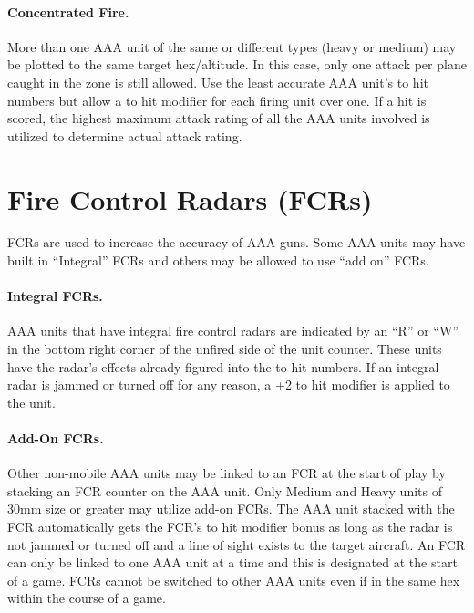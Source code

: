 \paragraph{Concentrated Fire.} More than one AAA unit of the same or different types (heavy or medium) may be plotted to the same target hex/altitude. In this case, only one attack per plane caught in the zone is still allowed. Use the least accurate AAA unit's to hit numbers but allow a  to hit modifier for each firing unit over one. If a hit is scored, the highest maximum attack rating of all the AAA units involved is utilized to determine actual attack rating.


\section{Fire Control Radars (FCRs)}

FCRs are used to increase the accuracy of AAA guns. Some AAA units may have built in “Integral” FCRs and others may be allowed to use “add on” FCRs.

\paragraph{Integral FCRs.} AAA units that have integral fire control radars are indicated by an “R” or “W” in the bottom right corner of the unfired side of the unit counter. These units have the radar's effects already figured into the to hit numbers. If an integral radar is jammed or turned off for any reason, a +2 to hit modifier is applied to the unit.

\paragraph{Add-On FCRs.} Other non-mobile AAA units may be linked to an FCR at the start of play by stacking an FCR counter on the AAA unit. Only Medium and Heavy units of 30mm size or greater may utilize add-on FCRs. The AAA unit stacked with the FCR automatically gets the FCR's to hit modifier bonus as long as the radar is not jammed or turned off and a line of sight exists to the target aircraft. An FCR can only be linked to one AAA unit at a time and this is designated at the start of a game. FCRs cannot be switched to other AAA units even if in the same hex within the course of a game.


